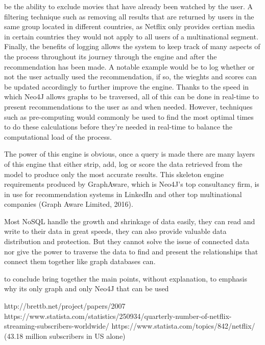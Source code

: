 \documentclass[a4paper]{article}
\begin{document}
be the ability to exclude movies that have already been watched by the user. A filtering technique such as removing all results that are returned by users in the same group located in different countries, as Netflix only provides certian media in certain countries they would not apply to all users of a multinational segment. Finally, the benefits of logging allows the system to keep track of many aspects of the process throughout its journey through the engine and after the recommendation has been made. A notable example would be to log whether or not the user actually used the recommendation, if so, the wieghts and scores can be updated accordingly to further improve the engine. Thanks to the speed in which Neo4J allows graphs to be traversed, all of this can be done in real-time to present recommendations to the user as and when needed. However, techniques such as pre-computing would commonly be used to find the most optimal times to do these calculations before they're needed in real-time to balance the computational load of the process.

The power of this engine is obvious, once a query is made there are many layers of this engine that either strip, add, log or score the data retrieved from the model to produce only the most accurate results. This skeleton engine requirements produced by GraphAware, which is Neo4J's top consultancy firm, is in use for recommendation systems in LinkedIn and other top multinational companies (Graph Aware Limited, 2016).

Most NoSQL handle the growth and shrinkage of data easily, they can read and write to their data in great speeds, they can also provide valuable data distribution and protection. But they cannot solve the issue of connected data nor give the power to traverse the data to find and present the relationships that connect them together like graph databases can. \par
to conclude bring together the main points, without explanation, to emphasis why its only graph and only Neo4J that can be used


http://brettb.net/project/papers/2007%
https://www.statista.com/statistics/250934/quarterly-number-of-netflix-streaming-subscribers-worldwide/
https://www.statista.com/topics/842/netflix/ (43.18 million subscribers in US alone)
\end{document}
